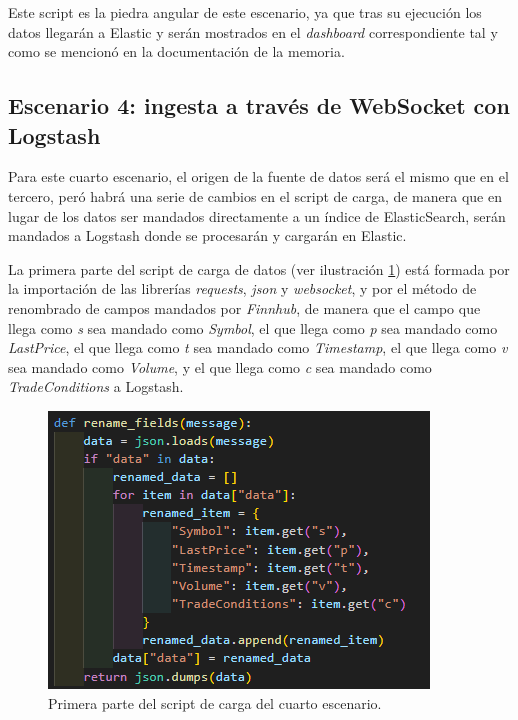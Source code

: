 Este script es la piedra angular de este escenario, ya que tras su ejecución los datos llegarán a Elastic y serán mostrados en el \textit{dashboard} correspondiente tal y como se mencionó en la documentación de la memoria.

\subsection{Escenario 4: ingesta a través de WebSocket con Logstash}

Para este cuarto escenario, el origen de la fuente de datos será el mismo que en el tercero, peró habrá una serie de cambios en el script de carga, de manera que en lugar de los datos ser mandados directamente a un índice de ElasticSearch, serán mandados a Logstash donde se procesarán y cargarán en Elastic.

La primera parte del script de carga de datos  (ver ilustración  \ref{fig:escenario41}) está formada por la importación de las librerías \textit{requests}, \textit{json} y \textit{websocket}, y por el método de renombrado de campos mandados por \textit{Finnhub}, de manera que el campo que llega como \textit{s} sea mandado como \textit{Symbol}, el que llega como \textit{p} sea mandado como \textit{LastPrice}, el que llega como \textit{t} sea mandado como \textit{Timestamp}, el que llega como \textit{v} sea mandado como \textit{Volume}, y el que llega como \textit{c} sea mandado como \textit{TradeConditions} a Logstash.

\begin{figure}
    \centering
    \includegraphics[width=1\linewidth]{img/websocket1.png}
    \caption{Primera parte del script de carga del cuarto escenario.}
    \label{fig:escenario41}
\end{figure}

